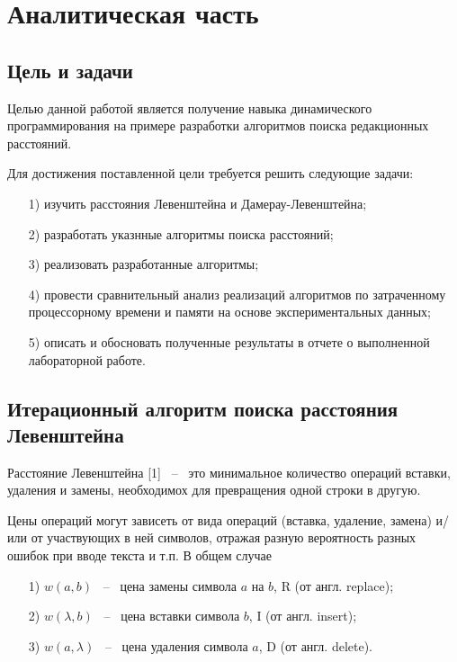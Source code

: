 \documentclass[a4paper,14pt, unknownkeysallowed]{extreport}
\begin{document}
	
\chapter{Аналитическая часть}
	
\section{Цель и задачи}
	
Целью данной работой является получение навыка динамического программирования на примере разработки алгоритмов поиска редакционных расстояний. 
    
Для достижения поставленной цели требуется решить следующие задачи:
    
\begin{itemize}
    \item[1)] изучить расстояния Левенштейна и Дамерау-Левенштейна;
    \item[2)] разработать указнные алгоритмы поиска расстояний;
    \item[3)] реализовать разработанные алгоритмы;
    \item[4)] провести сравнительный анализ реализаций алгоритмов по затраченному процессорному времени и памяти на основе экспериментальных данных;
    \item[5)] описать и обосновать полученные результаты в отчете о выполненной лабораторной работе.
\end{itemize}
	
	
\section{Итерационный алгоритм поиска расстояния Левенштейна}

Расстояние Левенштейна [1] ~--~ это минимальное количество операций вставки, удаления и замены, необходимох для превращения одной строки в другую.

Цены операций могут зависеть от вида операций (вставка, удаление, замена) и/или от участвующих в ней символов, отражая разную вероятность разных ошибок при вводе текста и т.п. В общем случае

\begin{itemize}
	\item[1)] $w(a, b)$ ~--~ цена замены символа $a$ на $b$, R (от англ. replace);
	\item[2)] $w(\lambda, b)$ ~--~ цена вставки символа $b$, I (от англ. insert);
	\item[3)] $w(a, \lambda)$ ~--~ цена удаления символа $a$, D (от англ. delete).
\end{itemize}
\end{document}
